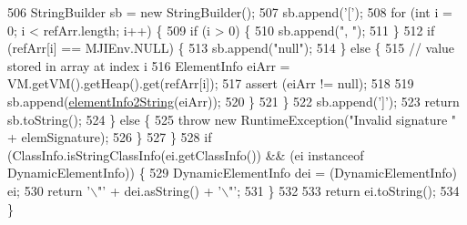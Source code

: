 \begin{DoxyCode}
506         StringBuilder sb = \textcolor{keyword}{new} StringBuilder();
507         sb.append(\textcolor{charliteral}{'['});
508         \textcolor{keywordflow}{for} (\textcolor{keywordtype}{int} i = 0; i < refArr.length; i++) \{
509           \textcolor{keywordflow}{if} (i > 0) \{
510             sb.append(\textcolor{stringliteral}{", "});
511           \}
512           \textcolor{keywordflow}{if} (refArr[i] == MJIEnv.NULL) \{
513             sb.append(\textcolor{stringliteral}{"null"});
514           \} \textcolor{keywordflow}{else} \{
515             \textcolor{comment}{// value stored in array at index i}
516             ElementInfo eiArr = VM.getVM().getHeap().get(refArr[i]);
517             assert (eiArr != null);
518 
519             sb.append(\hyperlink{classgov_1_1nasa_1_1jpf_1_1inspector_1_1server_1_1programstate_1_1_state_value_aea337730b417cd995d983e1cbcff744e}{elementInfo2String}(eiArr));
520           \}
521         \}
522         sb.append(\textcolor{charliteral}{']'});
523         \textcolor{keywordflow}{return} sb.toString();
524       \} \textcolor{keywordflow}{else} \{
525         \textcolor{keywordflow}{throw} \textcolor{keyword}{new} RuntimeException(\textcolor{stringliteral}{"Invalid signature "} + elemSignature);
526       \}
527     \}
528     \textcolor{keywordflow}{if} (ClassInfo.isStringClassInfo(ei.getClassInfo()) && (ei instanceof DynamicElementInfo)) \{
529       DynamicElementInfo dei = (DynamicElementInfo) ei;
530       \textcolor{keywordflow}{return} \textcolor{charliteral}{'\(\backslash\)"'} + dei.asString() + \textcolor{charliteral}{'\(\backslash\)"'};
531     \}
532 
533     \textcolor{keywordflow}{return} ei.toString();
534   \}
\end{DoxyCode}
